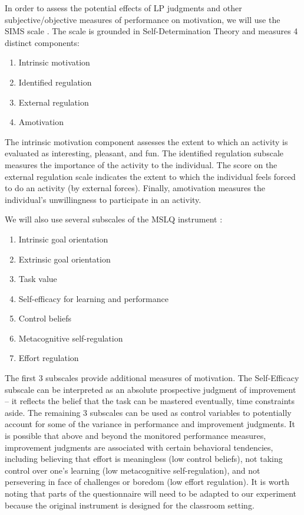 In order to assess the potential effects of \ac{LP} judgments and other subjective/objective measures of performance on motivation, we will use the \acf{SIMS} scale \cite{guay_assessment_2000}. The scale is grounded in Self-Determination Theory \cite{ryan_self-determination_2000,ryan_self-determination_2017} and measures 4 distinct components:
\begin{enumerate}
  \item Intrinsic motivation
  \item Identified regulation
  \item External regulation
  \item Amotivation
\end{enumerate}
The intrinsic motivation component assesses the extent to which an activity is evaluated as interesting, pleasant, and fun. The identified regulation subscale measures the importance of the activity to the individual. The score on the external regulation scale indicates the extent to which the individual feels forced to do an activity (by external forces). Finally, amotivation measures the individual's unwillingness to participate in an activity.

We will also use several subscales of the \acf{MSLQ} instrument \cite{duncan_motivated_2015}:
\begin{enumerate}
  \item Intrinsic goal orientation
  \item Extrinsic goal orientation
  \item Task value
  \item Self-efficacy for learning and performance
  \item Control beliefs
  \item Metacognitive self-regulation
  \item Effort regulation
\end{enumerate}
The first 3 subscales provide additional measures of motivation. The Self-Efficacy subscale can be interpreted as an absolute prospective judgment of improvement -- it reflects the belief that the task can be mastered eventually, time constraints aside. The remaining 3 subscales can be used as control variables to potentially account for some of the variance in performance and improvement judgments. It is possible that above and beyond the monitored performance measures, improvement judgments are associated with certain behavioral tendencies, including believing that effort is meaningless (low control beliefs), not taking control over one's learning (low metacognitive self-regulation), and not persevering in face of challenges or boredom (low effort regulation). It is worth noting that parts of the questionnaire will need to be adapted to our experiment because the original instrument is designed for the classroom setting.

